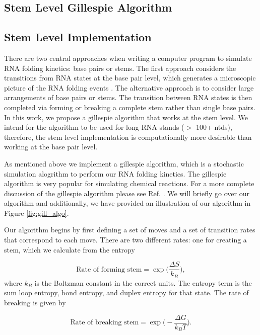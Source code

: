 \documentclass[11pt]{article}
\begin{document}
\begin{multicols}{2}
\section{Stem Level Gillespie Algorithm}

\subsection{Stem Level Implementation}
There are two central approaches when writing a computer program to simulate RNA folding kinetics: base pairs or stems. The first approach considers the transitions from RNA states at the base pair level, which generates a microscopic picture of the RNA folding events \cite{10.1093/nar/gkv480}. The alternative approach is to consider large arrangements of base pairs or stems. The transition between RNA states is then completed via forming or breaking a complete stem rather than single base pairs. In this work, we propose a gillespie algorithm that works at the stem level. We intend for the algorithm to be used for long RNA stands ($>$ 100+ ntds), therefore, the stem level implementation is computationally more desirable than working at the base pair level.

As mentioned above we implement a gillespie algorithm, which is a stochastic simulation alogrithm to perform our RNA folding kinetics. The gillespie algorithm is very popular for simulating chemical reactions.  For a more complete discussion of the gillespie algorithm please see Ref. \cite{erban2007practical}. We will briefly go over our algorithm and additionally, we have provided an illustration of our algorithm in Figure \ref{fig:gill_algo}.

Our algorithm begins by first defining a set of moves and a set of transition rates that correspond to each move. There are two different rates: one for creating a stem, which we calculate from the entropy

\begin{equation}
\text{Rate of forming stem} = \exp \Big (\frac{ \Delta S}{k_{B}} \Big ),
\end{equation}
where $k_{B}$ is the Boltzman constant in the correct units. The entropy term is the sum loop entropy, bond entropy, and duplex entropy for that state. The rate of breaking is given by

\begin{equation}
\text{Rate of breaking stem} = \exp \Big ( - \frac{ \Delta G}{k_{B} T} \Big ).
\end{equation}


\end{multicols}
\end{document}
